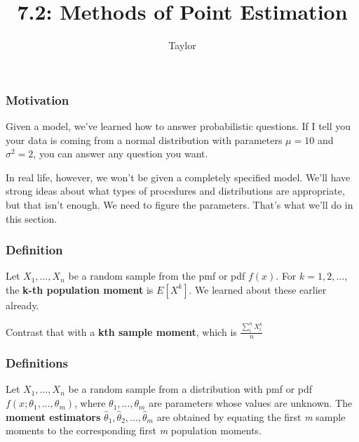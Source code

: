 \documentclass{beamer}
\title["7.2"]{7.2: Methods of Point Estimation}
\author{Taylor}
\institute[UVA] 
{
University of Virginia \\
\medskip
\textit{} 
}
\date{}
\begin{document}

\begin{frame}
\titlepage 
\end{frame}

\begin{frame}
\frametitle{Motivation}

Given a model, we've learned how to answer probabilistic questions. If I tell you your data is coming from a normal distribution with parameters $\mu = 10$ and $\sigma^2 = 2$, you can answer any question you want. 
\newline

In real life, however, we won't be given a completely specified model. We'll have strong ideas about what types of procedures and distributions are appropriate, but that isn't enough. We need to figure the parameters. That's what we'll do in this section.
\newline


\end{frame}

\begin{frame}
\frametitle{Definition}

Let $X_1, \ldots, X_n$ be a random sample from the pmf or pdf $f(x)$. For $k = 1, 2, \ldots$, the \textbf{k-th population moment} is $E[X^k]$. We learned about these earlier already. 
\newline

Contrast that with a \textbf{kth sample moment}, which is $\frac{ \sum_i^n X_i^k}{n}$

\end{frame}


\begin{frame}
\frametitle{Definitions}

Let $X_1, \ldots, X_n$ be a random sample from a distribution with pmf or pdf $f(x; \theta_1, \ldots, \theta_m)$, where $\theta_1, \ldots, \theta_m$ are parameters whose values are unknown. The \textbf{moment estimators} $\hat{\theta}_1, \hat{\theta}_2, \ldots, \hat{\theta}_m$  are obtained by equating the first \emph{m} sample moments to the corresponding first \emph{m} population moments. 

\end{frame}
\end{document}
